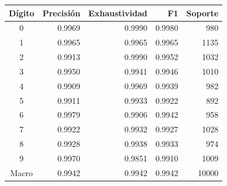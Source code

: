 \begin{tabular}{crrrr}
\hline
Dígito & Precisión & Exhaustividad & F1 & Soporte \\
\hline
0 & 0.9969 & 0.9990 & 0.9980 & 980 \\
1 & 0.9965 & 0.9965 & 0.9965 & 1135 \\
2 & 0.9913 & 0.9990 & 0.9952 & 1032 \\
3 & 0.9950 & 0.9941 & 0.9946 & 1010 \\
4 & 0.9909 & 0.9969 & 0.9939 & 982 \\
5 & 0.9911 & 0.9933 & 0.9922 & 892 \\
6 & 0.9979 & 0.9906 & 0.9942 & 958 \\
7 & 0.9922 & 0.9932 & 0.9927 & 1028 \\
8 & 0.9928 & 0.9938 & 0.9933 & 974 \\
9 & 0.9970 & 0.9851 & 0.9910 & 1009 \\
\hline
Macro & 0.9942 & 0.9942 & 0.9942 & 10000 \\
\hline
\end{tabular}
